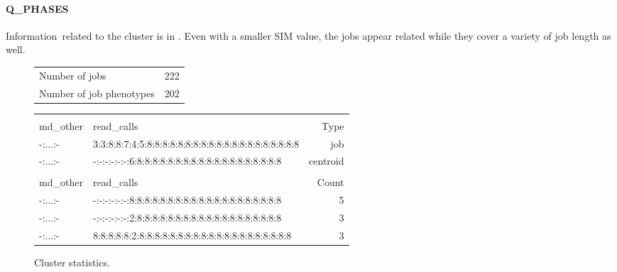 \documentclass{jhps}
\begin{document}
\FloatBarrier
\paragraph{Q\_PHASES}
Information\ related to the cluster is in .
Even with a smaller SIM value, the jobs appear related while they cover a variety of job length as well.

\begin{figure}
	\begin{subtable}{\textwidth}
		\centering
		\begin{tabular}{ll}
			Number of jobs      & 222  \\
			Number of job phenotypes & 202  \\
		\end{tabular}
		\caption{Cluster statistics.}
		\label{cluster:use_case:pm_quant:stats}
	\end{subtable}
	\medskip
	\begin{subtable}{\textwidth}
		\centering
		\begin{tiny}
      \begin{tabular}{ll|r}
       \rowcolor{tblhead}
       \multicolumn{2}{l|}{Q-coding} & \\
       \rowcolor{tblhead}
       md\_other                                           &  read\_calls                                           & Type     \\ 
       \hline
       -:...:-                                             &  3:3:8:8:7:4:5:8:8:8:8:8:8:8:8:8:8:8:8:8:8:8:8:8:8:8:8 & job      \\ 
       -:...:-                                             &  -:-:-:-:-:-:6:8:8:8:8:8:8:8:8:8:8:8:8:8:8:8:8:8:8:8   & centroid \\ 
       \multicolumn{3}{l}{}                                \\ 
       \rowcolor{tblhead}
       md\_other                                           &  read\_calls                                           & Count    \\ 
       \hline
       -:...:-                                             &  -:-:-:-:-:-:8:8:8:8:8:8:8:8:8:8:8:8:8:8:8:8:8:8:8:8   & 5        \\ 
       -:...:-                                             &  -:-:-:-:-:-:2:8:8:8:8:8:8:8:8:8:8:8:8:8:8:8:8:8:8:8   & 3        \\ 
       -:...:-                                             &  8:8:8:8:8:2:8:8:8:8:8:8:8:8:8:8:8:8:8:8:8:8:8:8:8:8   & 3        \\ 

\end{tabular}
\end{tiny}
\end{subtable}
\end{figure}
\end{document}
